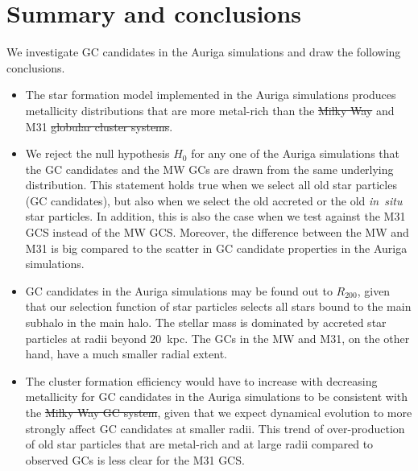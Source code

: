 \documentclass[a4paper,fleqn,usenatbib]{mnras}
\providecommand{\DIFadd}[1]{{\protect\color{blue}\uwave{#1}}} %
\providecommand{\DIFdel}[1]{{\protect\color{red}\sout{#1}}}                      %
\providecommand{\DIFaddbegin}{} %
\providecommand{\DIFaddend}{} %
\providecommand{\DIFdelbegin}{} %
\providecommand{\DIFdelend}{} %
\newcommand{\DIFscaledelfig}{0.5}
\newlength{\DIFdelgraphicswidth} %
\newlength{\DIFdelgraphicsheight} %
\newcommand{\DIFaddincludegraphics}[2][]{{\color{blue}\fbox{\DIFOincludegraphics[#1]{#2}}}} %
\newcommand{\DIFdelincludegraphics}[2][]{%
\sbox{\DIFdelgraphicsbox}{\DIFOincludegraphics[#1]{#2}}%
\settoboxwidth{\DIFdelgraphicswidth}{\DIFdelgraphicsbox} %
\settoboxtotalheight{\DIFdelgraphicsheight}{\DIFdelgraphicsbox} %
\scalebox{\DIFscaledelfig}{%
\parbox[b]{\DIFdelgraphicswidth}{\usebox{\DIFdelgraphicsbox}\\[-\baselineskip] \rule{\DIFdelgraphicswidth}{0em}}\llap{\resizebox{\DIFdelgraphicswidth}{\DIFdelgraphicsheight}{%
\setlength{\unitlength}{\DIFdelgraphicswidth}%
\begin{picture}(1,1)%
\thicklines\linethickness{2pt} %
{\color[rgb]{1,0,0}\put(0,0){\framebox(1,1){}}}%
{\color[rgb]{1,0,0}\put(0,0){\line( 1,1){1}}}%
{\color[rgb]{1,0,0}\put(0,1){\line(1,-1){1}}}%
\end{picture}%
}\hspace*{3pt}}} %
} %
\DeclareRobustCommand{\DIFaddbegin}{\DIFOaddbegin \let\includegraphics\DIFaddincludegraphics} %
\DeclareRobustCommand{\DIFaddend}{\DIFOaddend \let\includegraphics\DIFOincludegraphics} %
\DeclareRobustCommand{\DIFdelbegin}{\DIFOdelbegin \let\includegraphics\DIFdelincludegraphics} %
\DeclareRobustCommand{\DIFdelend}{\DIFOaddend \let\includegraphics\DIFOincludegraphics} %
\begin{document}
\section{Summary and conclusions}
\label{sec:conclusions}

We investigate GC candidates in the Auriga simulations and draw the following
conclusions.

\begin{itemize}
    \item The star formation model implemented in the Auriga simulations produces
    metallicity distributions that are more metal-rich than the \DIFdelbegin \DIFdel{Milky Way }\DIFdelend \DIFaddbegin \DIFadd{MW }\DIFaddend and M31
    \DIFdelbegin \DIFdel{globular cluster systems}\DIFdelend \DIFaddbegin \DIFadd{GCSs}\DIFaddend .

    \item We reject the null hypothesis $H_0$ for any one of the Auriga simulations 
    that the GC candidates and the MW GCs are drawn from the same underlying 
    distribution. This statement holds true when we select all old star particles 
    (GC candidates), but also when we select the old accreted or the old {\it in~situ} 
    star particles. In addition, this is also the case when we test against the 
    M31 GCS instead of the MW GCS. Moreover, the difference between the MW and
    M31 is big compared to the scatter in GC candidate properties in the Auriga
    simulations.

    \item GC candidates in the Auriga simulations may be found out to $R_{200}$,
    given that our selection function of star particles selects all stars bound
    to the main subhalo in the main halo. The stellar mass is dominated by accreted 
    star particles at radii beyond $20$~kpc. The GCs in the MW and M31, on the 
    other hand, have a much smaller radial extent.

    \item The cluster formation efficiency would have to increase with decreasing
    metallicity for GC candidates in the Auriga simulations to be consistent
    with the \DIFdelbegin \DIFdel{Milky Way GC system}\DIFdelend \DIFaddbegin \DIFadd{MW GCS}\DIFaddend , given that we expect dynamical evolution to 
    more strongly affect GC candidates at smaller radii. This trend of over-production
    of old star particles that are metal-rich and at large radii compared to 
    observed GCs is less clear for the M31 GCS.

\end{itemize}
\end{document}
